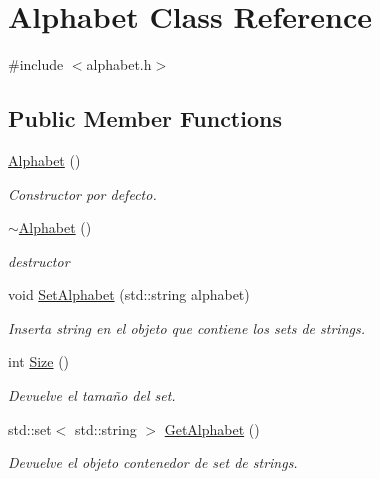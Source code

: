 \hypertarget{classAlphabet}{}\section{Alphabet Class Reference}
\label{classAlphabet}


{\ttfamily \#include $<$alphabet.\+h$>$}

\subsection*{Public Member Functions}
\begin{DoxyCompactItemize}
\item 
\hyperlink{classAlphabet_aac9f2f615174ca6c8f89331239cb765e}{Alphabet} ()
\begin{DoxyCompactList}\small\item\em Constructor por defecto. \end{DoxyCompactList}\item 
\mbox{\label{classAlphabet_a8a1da1bd7fdf2fd06a9768f9597a0b44}} 
\hyperlink{classAlphabet_a8a1da1bd7fdf2fd06a9768f9597a0b44}{$\sim$\+Alphabet} ()
\begin{DoxyCompactList}\small\item\em destructor \end{DoxyCompactList}\item 
\mbox{\label{classAlphabet_a2a61d36e511d77704215dce942847ed9}} 
void \hyperlink{classAlphabet_a2a61d36e511d77704215dce942847ed9}{Set\+Alphabet} (std\+::string alphabet)
\begin{DoxyCompactList}\small\item\em Inserta string en el objeto que contiene los sets de strings. \end{DoxyCompactList}\item 
\mbox{\label{classAlphabet_a154f45f063a75a8116e8f9022440287e}} 
int \hyperlink{classAlphabet_a154f45f063a75a8116e8f9022440287e}{Size} ()
\begin{DoxyCompactList}\small\item\em Devuelve el tamaño del set. \end{DoxyCompactList}\item 
\mbox{\label{classAlphabet_aa27c86b98daa058dc4f299b13c76ee8b}} 
std\+::set$<$ std\+::string $>$ \hyperlink{classAlphabet_aa27c86b98daa058dc4f299b13c76ee8b}{Get\+Alphabet} ()
\begin{DoxyCompactList}\small\item\em Devuelve el objeto contenedor de set de strings. \end{DoxyCompactList}\end{DoxyCompactItemize}


